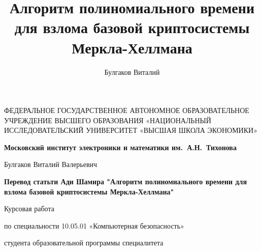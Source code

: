 \documentclass[a4paper,12pt]{report}
\author{Булгаков Виталий}
\title{Алгоритм полиномиального времени для взлома базовой криптосистемы Меркла-Хеллмана}
\begin{document}
\thispagestyle{empty}

\begin{center}

\sc
ФЕДЕРАЛЬНОЕ  ГОСУДАРСТВЕННОЕ АВТОНОМНОЕ
ОБРАЗОВАТЕЛЬНОЕ УЧРЕЖДЕНИЕ ВЫСШЕГО ОБРАЗОВАНИЯ
«НАЦИОНАЛЬНЫЙ ИССЛЕДОВАТЕЛЬСКИЙ УНИВЕРСИТЕТ
«ВЫСШАЯ ШКОЛА ЭКОНОМИКИ»
\end{center}

\begin{center}
\bf Московский институт электроники и математики им.~А.Н.~Тихонова
\end{center}

\vspace{1cm}

\begin{center}
Булгаков Виталий Валерьевич
\end{center}

\vspace{1cm}

\begin{center}
\bf Перевод статьти Ади Шамира "Алгоритм полиномиального времени для взлома базовой криптосистемы Меркла-Хеллмана"
\end{center}

\vspace{10mm}

\begin{center}
Курсовая работа \par
по специальности 10.05.01 «Компьютерная безопасность» \par
студента образовательной программы специалитета
\end{center}

\vfill
\end{document}
